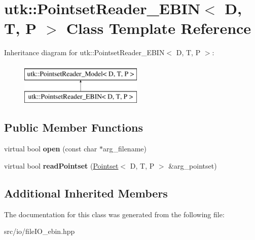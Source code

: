 \hypertarget{classutk_1_1PointsetReader__EBIN}{\section{utk\-:\-:Pointset\-Reader\-\_\-\-E\-B\-I\-N$<$ D, T, P $>$ Class Template Reference}
\label{classutk_1_1PointsetReader__EBIN}
}
Inheritance diagram for utk\-:\-:Pointset\-Reader\-\_\-\-E\-B\-I\-N$<$ D, T, P $>$\-:\begin{figure}[H]
\begin{center}
\leavevmode
\includegraphics[height=2.000000cm]{classutk_1_1PointsetReader__EBIN}
\end{center}
\end{figure}
\subsection*{Public Member Functions}
\begin{DoxyCompactItemize}
\item 
\hypertarget{classutk_1_1PointsetReader__EBIN_ae93eeb9b8cb8e7afe0c48bdbc29cbe68}{virtual bool {\bfseries open} (const char $\ast$arg\-\_\-filename)}\label{classutk_1_1PointsetReader__EBIN_ae93eeb9b8cb8e7afe0c48bdbc29cbe68}

\item 
\hypertarget{classutk_1_1PointsetReader__EBIN_ad7de78fa90c38f802e8952cc19791792}{virtual bool {\bfseries read\-Pointset} (\hyperlink{classutk_1_1Pointset}{Pointset}$<$ D, T, P $>$ \&arg\-\_\-pointset)}\label{classutk_1_1PointsetReader__EBIN_ad7de78fa90c38f802e8952cc19791792}

\end{DoxyCompactItemize}
\subsection*{Additional Inherited Members}


The documentation for this class was generated from the following file\-:\begin{DoxyCompactItemize}
\item 
src/io/file\-I\-O\-\_\-ebin.\-hpp\end{DoxyCompactItemize}
